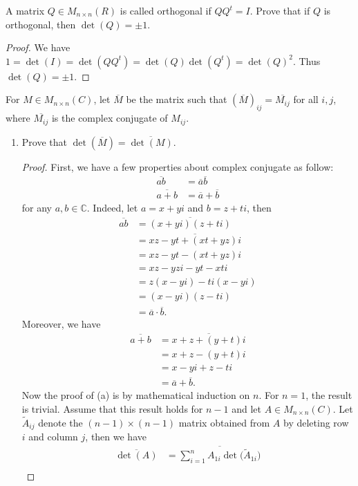 \documentclass[12pt, a4paper]{article}
\theoremstyle{plain}
\newcommand{\C}{\mathbb{C}}
\begin{document}
\begin{exercise}{12}
A matrix $Q\in M_{n\times n}(R)$ is called orthogonal if $QQ^t=I$. Prove that if $Q$ is orthogonal, then $\det(Q)=\pm 1$.
\end{exercise}
	\begin{proof}
	We have $1=\det(I)=\det(QQ^t)=\det(Q)\det(Q^t)=\det(Q)^2$. Thus $\det(Q)=\pm 1$.
	\end{proof}
	
\begin{exercise}{13}
For $M\in M_{n\times n}(C)$, let $\overline{M}$ be the matrix such that $(\overline{M})_{ij}=\overline{M_{ij}}$ for all $i,j$, where $\overline{M_{ij}}$ is the complex conjugate of $M_{ij}$.
	\begin{enumerate}[label=(\alph*)]
	\item Prove that $\det(\overline{M})=\overline{\det(M)}$.
		\begin{proof}
		First, we have a few properties about complex conjugate as follow:
		\begin{align*}
		\overline{ab}&=\overline{a}\overline{b}\\
		\overline{a+b}&=\overline{a}+\overline{b}
		\end{align*}
		for any $a,b\in\C$. Indeed, let $a=x+yi$ and $b=z+ti$, then
		\begin{align*}
		\overline{ab}&=\overline{(x+yi)(z+ti)}\\
		&=\overline{xz-yt+(xt+yz)i}\\
		&=xz-yt-(xt+yz)i\\
		&=xz-yzi-yt-xti\\
		&=z(x-yi)-ti(x-yi)\\
		&=(x-yi)(z-ti)\\
		&=\overline{a}\cdot\overline{b}.
		\end{align*}
		Moreover, we have
		\begin{align*}
		\overline{a+b}&=\overline{x+z+(y+t)i}\\
		&=x+z-(y+t)i\\
		&=x-yi+z-ti\\
		&=\overline{a}+\overline{b}.
		\end{align*}
		Now the proof of (a) is by mathematical induction on $n$. For $n=1$, the result is trivial. Assume that this result holds for $n-1$ and let $A\in M_{n\times n}(C)$. Let $\tilde{A}_{ij}$ denote the $(n-1)\times (n-1)$ matrix obtained from $A$ by deleting row $i$ and column $j$, then we have
		\begin{align*}
		\overline{\det(A)}&=\overline{\sum_{i=1}^{n}{A_{1i}\det(\tilde{A}_{1i}})}\\

\end{align*}
\end{proof}
\end{enumerate}
\end{exercise}
\end{document}
